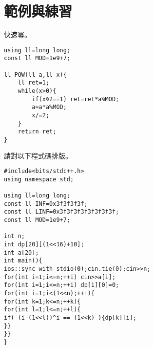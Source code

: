 \section{範例與練習}
    \example 快速冪。
    
    \begin{lstlisting}[caption=排版範例]
using ll=long long;
const ll MOD=1e9+7;

ll POW(ll a,ll x){
    ll ret=1;
    while(x>0){
        if(x%2==1) ret=ret*a%MOD;
        a=a*a%MOD;
        x/=2;
    }
    return ret;
}\end{lstlisting}

    \problem 請對以下程式碼排版。
    \begin{lstlisting}
#include<bits/stdc++.h>
using namespace std;

using ll=long long;
const ll INF=0x3f3f3f3f;
const ll LINF=0x3f3f3f3f3f3f3f3f;
const ll MOD=1e9+7;

int n;
int dp[20][(1<<16)+10];
int a[20];
int main(){
ios::sync_with_stdio(0);cin.tie(0);cin>>n;
for(int i=1;i<=n;++i) cin>>a[i];
for(int i=1;i<=n;++i) dp[i][0]=0;
for(int i=1;i<(1<<n);++i){
for(int k=1;k<=n;++k){
for(int l=1;l<=n;++l){
if( (i-(1<<l))^i == (1<<k) ){dp[k][i];
}}
}}
}\end{lstlisting}

